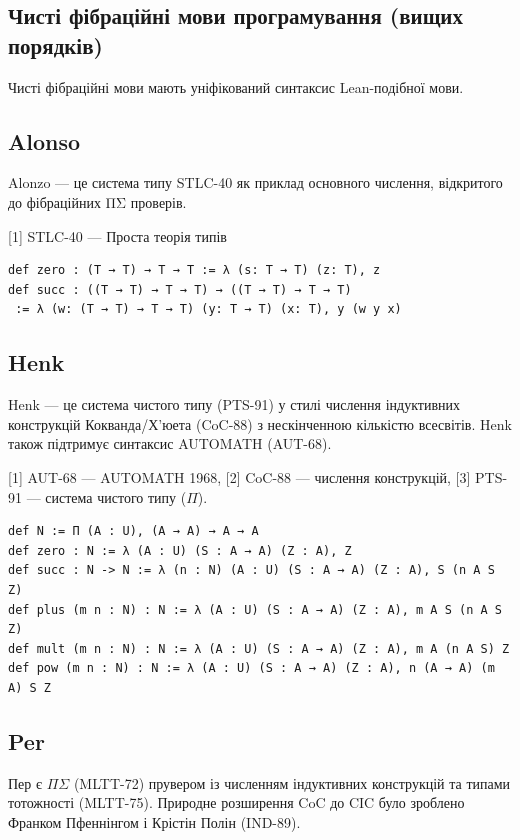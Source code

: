 \newpage
\subsection*{Чисті фібраційні мови програмування (вищих порядків)}

Чисті фібраційні мови мають уніфікований синтаксис Lean-подібної мови.

\subsection*{Alonso}

Alonzo — це система типу STLC-40 як приклад основного числення,
відкритого до фібраційних ΠΣ проверів.

[1] STLC-40 — Проста теорія типів

\begin{lstlisting}
def zero : (T → T) → T → T := λ (s: T → T) (z: T), z
def succ : ((T → T) → T → T) → ((T → T) → T → T)
 := λ (w: (T → T) → T → T) (y: T → T) (x: T), y (w y x)
\end{lstlisting}

\subsection*{Henk}

Henk — це система чистого типу (PTS-91) у стилі числення індуктивних
конструкцій Кокванда/Х’юета (CoC-88) з нескінченною кількістю всесвітів.
Henk також підтримує синтаксис AUTOMATH (AUT-68).

[1] AUT-68 — AUTOMATH 1968, [2] CoC-88 — числення конструкцій, [3] PTS-91 — система чистого типу ($\Pi$).

\begin{lstlisting}
def N := Π (A : U), (A → A) → A → A
def zero : N := λ (A : U) (S : A → A) (Z : A), Z
def succ : N -> N := λ (n : N) (A : U) (S : A → A) (Z : A), S (n A S Z)
def plus (m n : N) : N := λ (A : U) (S : A → A) (Z : A), m A S (n A S Z)
def mult (m n : N) : N := λ (A : U) (S : A → A) (Z : A), m A (n A S) Z
def pow (m n : N) : N := λ (A : U) (S : A → A) (Z : A), n (A → A) (m A) S Z
\end{lstlisting}

\subsection*{Per}

Пер є $\Pi\Sigma$ (MLTT-72) прувером із численням індуктивних конструкцій
та типами тотожності (MLTT-75). Природне розширення CoC до CIC було
зроблено Франком Пфеннінгом і Крістін Полін (IND-89).

